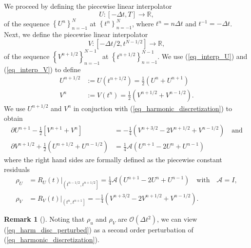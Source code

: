 \documentclass[12pt,a4paper]{article}
\numberwithin{equation}{section}
\theoremstyle{definition}
\newcommand{\qp}[1]{\left(#1\right)}
\newcommand{\qb}[1]{\left[#1\right]}
\newcommand{\bracegs}[1]{\left\lbrace#1\right\rbrace}
\newtheorem{Rem}[subsection]{Remark}
\begin{document}
   We proceed by defining  the piecewise linear interpolator 
\begin{equation}\label{eq_interp_U}
U:\qb{-\Delta t, T}\rightarrow \mathbb{R},
\end{equation}
of the sequence $\bracegs{U^n}_{n=-1}^N$ at $\bracegs{t^n}_{n=-1}^N$, where  $t^n=n\Delta t$ and $t^{-1} = -\Delta t$.  Next, we define the piecewise linear interpolator
\begin{equation}\label{eq_interp_V}
V:\qb{-\Delta t /2, t^{N-1/2}}\rightarrow\mathbb{R},
\end{equation}
 of the sequence $\bracegs{V^{n+1/2}}_{n=-1}^{N-1}$ at $\bracegs{t^{n+1/2}}_{n=-1}^{N-1}$.  
We use (\ref{eq_interp_U}) and (\ref{eq_interp_V}) to define
\begin{equation}
\begin{aligned}
U^{n+1/2}&:=U\qp{t^{n+1/2}}=\frac{1}{2}\qp{U^n+U^{n+1}}\\
V^{n}&:=V\qp{t^{n}}= \frac{1}{2}\qp{V^{n+1/2}+V^{n-1/2}}.
\end{aligned}
\end{equation}
We use  $U^{n+1/2}$ and $V^n$ in conjuction with  (\ref{eq_harmonic_discretization}) to obtain  
\begin{equation}\label{eq_harm_disc_perturbed}
\begin{aligned}
\partial U^{n+1}-\frac{1}{2}\qb{V^{n+1}+V^n}&= -\frac{1}{4}\left(V^{n+3/2}-2V^{n+1/2}+V^{n-1/2}\right) \quad \text{and}\\
\partial V^{n+1/2} +\frac{1}{2}\qp{U^{n+1/2}+U^{n-1/2}}&=\frac{1}{4}\mathcal{A}\left(U^{n+1}-2U^n+U^{n-1}\right)
\end{aligned}
\end{equation}
where the right hand sides are formally defined as the piecewise constant residuals
\begin{equation}
\begin{aligned}
\rho_U&=R_U\left(t\right)|_{\left(t^{n-1/2}, t^{n+1/2}\right]}=\frac{1}{4}\mathcal{A}\left(U^{n+1}-2U^n+U^{n-1}\right)\quad\text{with}\quad \mathcal{A}=I,\\
\rho_V&=R_V\left(t\right)|_{\left(t^n, t^{n+1}\right]}=-\frac{1}{4}\left(V^{n+3/2}-2V^{n+1/2}+V^{n-1/2}\right).
\end{aligned}
\end{equation}
\begin{Rem}[]\label{Rem_opt_perturbation}
Noting that $\rho_u$ and $\rho_V$ are $\mathcal{O}\qp{\Delta t^2}$,  we can view  (\ref{eq_harm_disc_perturbed}) as a second order perturbation of (\ref{eq_harmonic_discretization}).
\end{Rem}
\end{document}
